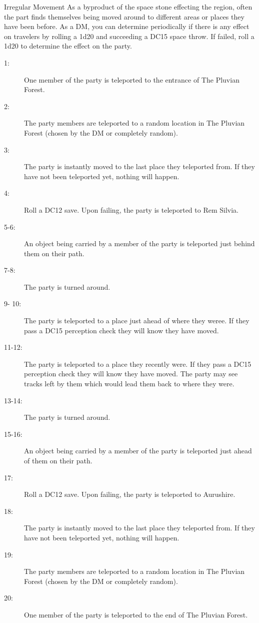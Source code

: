\begin{commentbox}{Irregular Movement}
	As a byproduct of the space stone effecting the region, often the part finds themselves being moved around to different areas or places they have been before. As a DM, you can determine periodically if there is any effect on travelers by rolling a 1d20 and succeeding a DC15 space throw. If failed, roll a 1d20 to determine the effect on the party.
	\hline
	\begin{description}
		\item[1:] One member of the party is teleported to the entrance of The Pluvian Forest.
		\item[2:] The party members are teleported to a random location in The Pluvian Forest (chosen by the DM or completely random).
		\item[3:] The party is instantly moved to the last place they teleported from. If they have not been teleported yet, nothing will happen.
		\item[4:] Roll a DC12 save. Upon failing, the party is teleported to Rem Silvia.
		\item[5-6:] An object being carried by a member of the party is teleported just behind them on their path.
		\item[7-8:] The party is turned around.
		\item[9- 10:] The party is teleported to a place just ahead of where they weree. If they pass a DC15 perception check they will know they have moved. 
		\item[11-12:] The party is teleported to a place they recently were. If they pass a DC15 perception check they will know they have moved. The party may see tracks left by them which would lead them back to where they were.
		\item[13-14:] The party is turned around.
		\item[15-16:] An object being carried by a member of the party is teleported just ahead of them on their path. 
		\item[17:] Roll a DC12 save. Upon failing, the party is teleported to Aurushire.
		\item[18:] The party is instantly moved to the last place they teleported from. If they have not been teleported yet, nothing will happen.
		\item[19:] The party members are teleported to a random location in The Pluvian Forest (chosen by the DM or completely random).
		\item[20:] One member of the party is teleported to the end of The Pluvian Forest.
	\end{description}
\end{commentbox}

